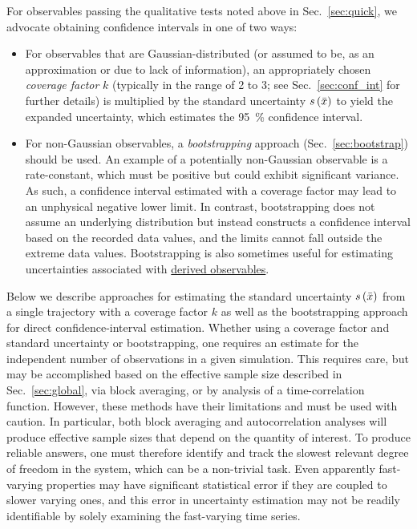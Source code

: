 For observables passing the qualitative tests noted above in Sec.\ \ref{sec:quick}, we advocate obtaining confidence intervals in one of two ways:
\begin{itemize}
\item For observables that are Gaussian-distributed (or assumed to be, as an approximation or due to lack of information), an appropriately chosen \emph{coverage factor} $k$ (typically in the range of 2 to 3; see Sec.~\ref{sec:conf_int} for further details) is multiplied by the standard uncertainty $s\left( \bar{x} \right)$ to yield the expanded uncertainty, which estimates the 95~\% confidence interval.
\item For non-Gaussian observables, a \emph{bootstrapping} approach (Sec.~\ref{sec:bootstrap}) should be used.
  An example of a potentially non-Gaussian observable is a rate-constant, which must be positive but could exhibit significant variance.  As such, a confidence interval estimated with a coverage factor may lead to an unphysical negative lower limit.
  In contrast, bootstrapping does not assume an underlying distribution but instead constructs a confidence interval based on the recorded data values, and the limits cannot fall outside the extreme data values.
  Bootstrapping is also sometimes useful for estimating uncertainties associated with \hyperref[def:deriv_obs]{derived observables}.
\end{itemize}

Below we describe approaches for estimating the standard uncertainty $s\left( \bar{x} \right)$ from a single trajectory with a coverage factor $k$ as well as the bootstrapping approach for direct confidence-interval estimation. Whether using a coverage factor and standard uncertainty or bootstrapping, one requires an estimate for the independent number of observations in a given simulation.  This requires care, but may be accomplished based on the effective sample size described in Sec.~\ref{sec:global}, via block averaging, or by analysis of a time-correlation function. However, these methods have their limitations and must be used with caution.  In particular, both block averaging and autocorrelation analyses will produce effective sample sizes that depend on the quantity of interest.  To produce reliable answers, one must therefore identify and track the slowest relevant degree of freedom in the system, which can be a non-trivial task.  Even apparently fast-varying properties may have significant statistical error if they are coupled to slower varying ones, and this error in uncertainty estimation may not be readily identifiable by solely examining the fast-varying time series.

